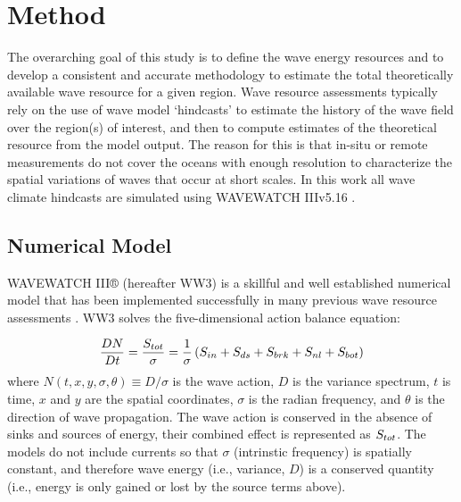 \section{Method} \label{sec:method}
The overarching goal of this study is to define the wave energy resources and to develop a consistent and accurate methodology to estimate the total theoretically available wave resource for a given region. 
Wave resource assessments typically rely on the use of wave model `hindcasts' to estimate the history of the wave field over the region(s) of interest, and then to compute estimates of the theoretical resource from the model output. The reason for this is that in-situ or remote measurements do not cover the oceans with enough resolution to characterize the spatial variations of waves that occur at short scales. 
In this work all wave climate hindcasts are simulated using WAVEWATCH III\textregistered v5.16 \citep{tolmanDistributedmemoryConceptsWave2002}.

\subsection{Numerical Model} \label{sec:method:model}
WAVEWATCH III® (hereafter WW3) is a skillful and well established numerical model that has been implemented successfully in many previous wave resource assessments \citep[e.g.,][]{garcia-medinaWaveResourceAssessment2014,yangWaveModelTest2017}.
WW3 solves the five-dimensional action balance equation:

\begin{align}
  \frac{DN}{Dt} = \frac{S_{ tot }}{\sigma} = \frac{1}{\sigma}\left ( S_{ in } + S_{ ds } + S_{ brk } + S_{ nl } + S_{ bot } \right )
\end{align}
where $N(t,x,y,\sigma,\theta) \equiv D/\sigma$ is the wave action, $D$ is the variance spectrum, $t$ is time, $x$ and $y$ are the spatial coordinates, $\sigma$ is the radian frequency, and $\theta$ is the direction of wave propagation.
The wave action is conserved in the absence of sinks and sources of energy, their combined effect is represented as $S_{ tot }$.
The models do not include currents so that $\sigma$ (intrinstic frequency) is spatially constant, and therefore wave energy (i.e., variance, $D$) is a conserved quantity (i.e., energy is only gained or lost by the source terms above).

